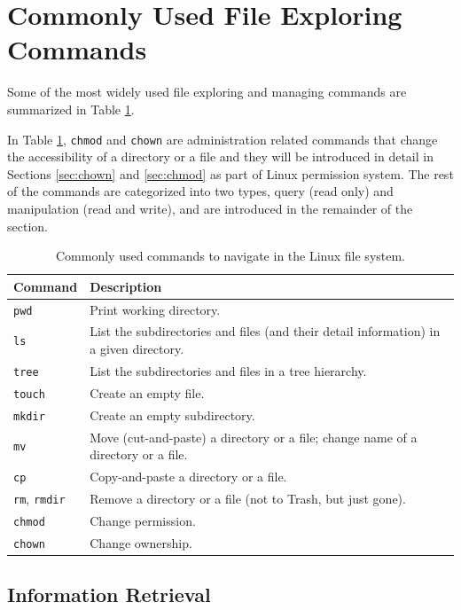 \section{Commonly Used File Exploring Commands} \label{ch:fm:sec:filemanagement}

Some of the most widely used file exploring and managing commands are summarized in Table \ref{ch:fm:tab:commonfilecommands}. 

In Table \ref{ch:fm:tab:commonfilecommands}, \verb|chmod| and \verb|chown| are administration related commands that change the accessibility of a directory or a file and they will be introduced in detail in Sections \ref{sec:chown} and \ref{sec:chmod} as part of Linux permission system. The rest of the commands are categorized into two types, query (read only) and manipulation (read and write), and are introduced in the remainder of the section.

\begin{table}[!htb]
  \centering \caption{Commonly used commands to navigate in the Linux file system.}\label{ch:fm:tab:commonfilecommands}
  \begin{tabularx}{\textwidth}{lX}
    \hline
    Command & Description \\ \hline
    \verb|pwd| & Print working directory. \\ 
    \verb|ls| & List the subdirectories and files (and their detail information) in a given directory. \\ 
    \verb|tree| & List the subdirectories and files in a tree hierarchy. \\  
    \verb|touch| & Create an empty file. \\ 
    \verb|mkdir| & Create an empty subdirectory. \\ 
    \verb|mv| & Move (cut-and-paste) a directory or a file; change name of a directory or a file. \\ 
    \verb|cp| & Copy-and-paste a directory or a file. \\ 
    \verb|rm|, \verb|rmdir| & Remove a directory or a file (not to Trash, but just gone). \\ 
    \verb|chmod| & Change permission. \\ 
    \verb|chown| & Change ownership. \\
    \hline
  \end{tabularx}
\end{table}

\subsection{Information Retrieval}

